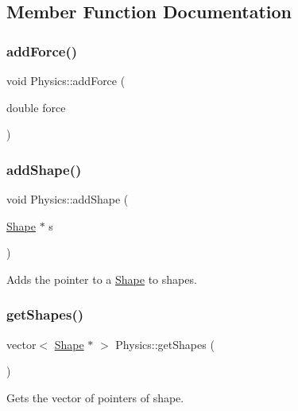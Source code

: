 \subsection{Member Function Documentation}
\mbox{\label{class_physics_aaa8c532b63deb718c73aa0f3aaadccb4}} 
\subsubsection{\texorpdfstring{addForce()}{addForce()}}
{\footnotesize\ttfamily void Physics\+::add\+Force (\begin{DoxyParamCaption}\item[{double}]{force }\end{DoxyParamCaption})}

\mbox{\label{class_physics_acff9e03cc4cff17239a8fb25a6ecbd76}} 
\subsubsection{\texorpdfstring{addShape()}{addShape()}}
{\footnotesize\ttfamily void Physics\+::add\+Shape (\begin{DoxyParamCaption}\item[{\mbox{\hyperlink{class_shape}{Shape}} $\ast$}]{s }\end{DoxyParamCaption})}



Adds the pointer to a \mbox{\hyperlink{class_shape}{Shape}} to shapes. 

\mbox{\label{class_physics_aa65295ddbbb7cdf44fa6273c028e3cb6}} 
\subsubsection{\texorpdfstring{getShapes()}{getShapes()}}
{\footnotesize\ttfamily vector$<$ \mbox{\hyperlink{class_shape}{Shape}} $\ast$ $>$ Physics\+::get\+Shapes (\begin{DoxyParamCaption}{ }\end{DoxyParamCaption})}



Gets the vector of pointers of shape. 

